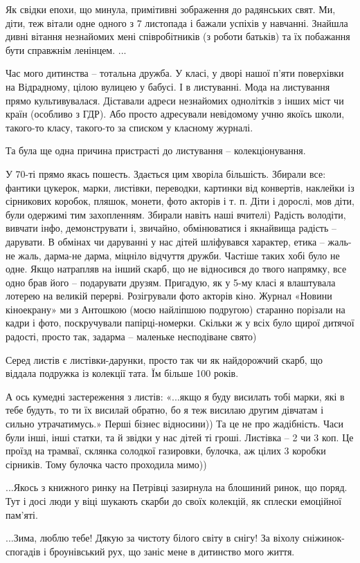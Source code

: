 Як свідки епохи, що минула, примітивні зображення до радянських свят. Ми,
діти, теж вітали одне одного з 7 листопада і бажали успіхів у навчанні.
Знайшла дивні вітання незнайомих мені співробітників (з роботи батьків) та їх
побажання бути справжнім ленінцем. ...

Час мого дитинства – тотальна дружба. У класі, у дворі нашої п’яти поверхівки
на Відрадному, цілою вулицею у бабусі. І в листуванні. Мода на листування прямо
культивувалася. Діставали адреси незнайомих однолітків з інших міст чи країн
(особливо з ГДР). Або просто адресували невідомому учню якоїсь школи, такого-то
класу, такого-то за списком у класному журналі.

Та була ще одна причина пристрасті до листування – колекціонування.

У 70-ті прямо якась пошесть. Здається цим хворіла більшість. Збирали все:
фантики цукерок, марки, листівки, переводки, картинки від конвертів, наклейки
із сірникових коробок, пляшок, монети, фото акторів і т. п. Діти і дорослі, мов
діти, були одержимі тим захопленням. Збирали навіть наші вчителі) Радість
володіти, вивчати інфо, демонструвати і, звичайно, обмінюватися і якнайвища
радість – дарувати. В обмінах чи даруванні у нас дітей шліфувався характер,
етика – жаль-не жаль, дарма-не дарма, міцніло відчуття дружби. Частіше таких
хобі було не одне. Якщо натрапляв на інший скарб, що не відносився до твого
напрямку, все одно брав його – подарувати друзям. Пригадую, як у 5-му класі я
влаштувала лотерею на великій перерві. Розігрували фото акторів кіно. Журнал
«Новини кіноекрану» ми з Антошкою (моєю найліпшою подругою) старанно порізали
на кадри і фото, поскручували папірці-номерки. Скільки ж у всіх було щирої
дитячої радості, просто так, задарма – маленьке несподіване свято)

Серед листів є листівки-дарунки, просто так чи як найдорожчий скарб, що віддала
подружка із колекції тата. Їм більше 100 років.

А ось кумедні застереження з листів: «...якщо я буду висилать тобі марки, які в
тебе будуть, то ти їх висилай обратно, бо я теж висилаю другим дівчатам і
сильно утрачатимусь.» Перші бізнес відносини)) Та це не про жадібність. Часи
були інші, інші статки, та й звідки у нас дітей ті гроші. Листівка – 2 чи 3
коп. Це проїзд на трамваї, склянка солодкої газировки, булочка, аж цілих 3
коробки сірників. Тому булочка часто проходила мимо))

...Якось з книжного ринку на Петрівці зазирнула на блошиний ринок, що поряд. Тут
і досі люди у віці шукають скарби до своїх колекцій, як сплески емоційної
пам’яті.

...Зима, люблю тебе! Дякую за чистоту білого світу в снігу! За віхолу
сніжинок-спогадів і броунівський рух, що заніс мене в дитинство мого життя.

